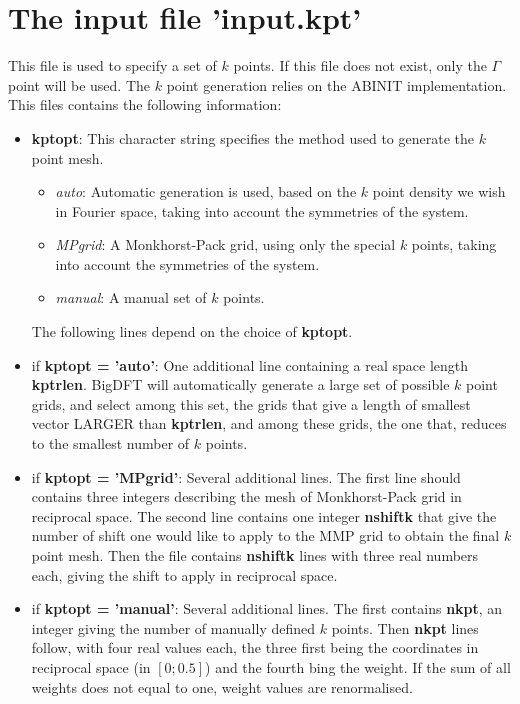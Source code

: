 \documentclass[a4paper,11pt]{report}
\begin{document}
\section{The input file 'input.kpt'}
This file is used to specify a set of $k$ points. If this file does not exist, only the $\Gamma$ point will be used. The $k$ point generation relies on the ABINIT implementation. This files contains the following information:
\begin{itemize}
  \item  \textbf{kptopt}: This character string specifies the method used to generate the $k$ point mesh.
       \begin{itemize}
       \item  \emph{auto}: Automatic generation is used, based on the $k$ point density we wish in Fourier space, taking into account the symmetries of the system.
       \item  \emph{MPgrid}: A Monkhorst-Pack grid, using only the special $k$ points, taking into account the symmetries of the system.
       \item  \emph{manual}: A manual set of $k$ points.
       \end{itemize}
       The following lines depend on the choice of \textbf{kptopt}.
  \item  if \textbf{kptopt = 'auto'}: One additional line containing a real space length \textbf{kptrlen}. BigDFT will automatically generate a large set of possible $k$ point grids, and select among this set, the grids that give a length of smallest vector LARGER than \textbf{kptrlen}, and among these grids, the one that, reduces to the smallest number of $k$ points.
  \item  if \textbf{kptopt = 'MPgrid'}: Several additional lines. The first line should contains three integers describing the mesh of Monkhorst-Pack grid in reciprocal space. The second line contains one integer \textbf{nshiftk} that give the number of shift one would like to apply to the MMP grid to obtain the final $k$ point mesh. Then the file contains \textbf{nshiftk} lines with three real numbers each, giving the shift to apply in reciprocal space.
  \item  if \textbf{kptopt = 'manual'}: Several additional lines. The first contains \textbf{nkpt}, an integer giving the number of manually defined $k$ points. Then \textbf{nkpt} lines follow, with four real values each, the three first being the coordinates in reciprocal space (in $[0;0.5]$) and the fourth bing the weight. If the sum of all weights does not equal to one, weight values are renormalised.
\end{itemize}
\end{document}
